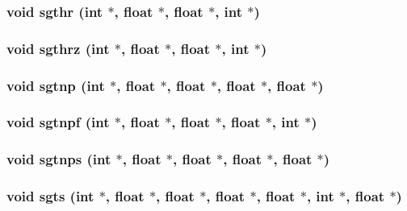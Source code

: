 \subsubsection{\setlength{\rightskip}{0pt plus 5cm}void sgthr (int $\ast$, float $\ast$, float $\ast$, int $\ast$)}\label{essl_8h_7624c4898dbe908168be5cdddec1f096}


\subsubsection{\setlength{\rightskip}{0pt plus 5cm}void sgthrz (int $\ast$, float $\ast$, float $\ast$, int $\ast$)}\label{essl_8h_beff416b8d29538b124ef5f24d6084c6}


\subsubsection{\setlength{\rightskip}{0pt plus 5cm}void sgtnp (int $\ast$, float $\ast$, float $\ast$, float $\ast$, float $\ast$)}\label{essl_8h_2bd4b267059340b6b149311d69bdefcc}


\subsubsection{\setlength{\rightskip}{0pt plus 5cm}void sgtnpf (int $\ast$, float $\ast$, float $\ast$, float $\ast$, int $\ast$)}\label{essl_8h_330cddcae22c26834c1f3776bb1053f9}


\subsubsection{\setlength{\rightskip}{0pt plus 5cm}void sgtnps (int $\ast$, float $\ast$, float $\ast$, float $\ast$, float $\ast$)}\label{essl_8h_f5b4a1bb3ed173eaa97ce6114580de95}


\subsubsection{\setlength{\rightskip}{0pt plus 5cm}void sgts (int $\ast$, float $\ast$, float $\ast$, float $\ast$, float $\ast$, int $\ast$, float $\ast$)}\label{essl_8h_af3ffe55367b1455f6256e17e5483554}


